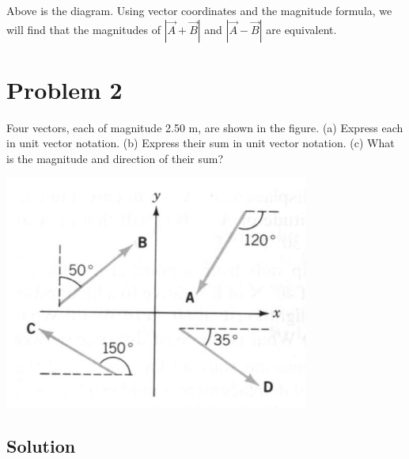 \documentclass[12pt]{article}
\begin{document}
Above is the diagram. Using vector coordinates and the magnitude formula, we will find that the magnitudes of $|\Vec{A} + \Vec{B}|$ and $|\Vec{A} - \Vec{B}|$ are equivalent.

\pagebreak
\section*{Problem 2}
Four vectors, each of magnitude 2.50 m, are shown in the figure. (a) Express each in unit
vector notation. (b) Express their sum in unit vector notation. (c) What is the magnitude and direction of their sum?

\begin{center}
    \includegraphics*[width=10cm]{graph_2.png}
\end{center}

\subsection*{Solution}
\end{document}
